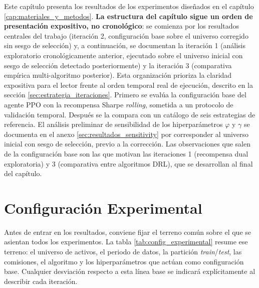 \documentclass[IB,a4paper]{TFUOC}
\begin{document}
Este capítulo presenta los resultados de los experimentos diseñados en el capítulo \ref{cap:materiales_y_metodos}. \textbf{La estructura del capítulo sigue un orden de presentación expositivo, no cronológico}: se comienza por los resultados centrales del trabajo (iteración 2, configuración base sobre el universo corregido sin sesgo de selección) y, a continuación, se documentan la iteración 1 (análisis exploratorio cronológicamente anterior, ejecutado sobre el universo inicial con sesgo de selección detectado posteriormente) y la iteración 3 (comparativa empírica multi-algoritmo posterior). Esta organización prioriza la claridad expositiva para el lector frente al orden temporal real de ejecución, descrito en la sección \ref{sec:estrategia_iteraciones}. Primero se evalúa la configuración base del agente PPO con la recompensa Sharpe \textit{rolling}, sometida a un protocolo de validación temporal. Después se la compara con un catálogo de seis estrategias de referencia. El análisis preliminar de sensibilidad de los hiperparámetros $\varphi$ y $\gamma$ se documenta en el anexo \ref{sec:resultados_sensitivity} por corresponder al universo inicial con sesgo de selección, previo a la corrección. Las observaciones que salen de la configuración base son las que motivan las iteraciones 1 (recompensa dual exploratoria) y 3 (comparativa entre algoritmos DRL), que se desarrollan al final del capítulo.

\section{Configuración Experimental}
\label{sec:resultados_config}

Antes de entrar en los resultados, conviene fijar el terreno común sobre el que se asientan todos los experimentos. La tabla \ref{tab:config_experimental} resume ese terreno: el universo de activos, el periodo de datos, la partición \textit{train}/\textit{test}, las comisiones, el algoritmo y los hiperparámetros que actúan como configuración base. Cualquier desviación respecto a esta línea base se indicará explícitamente al describir cada iteración.
\end{document}

